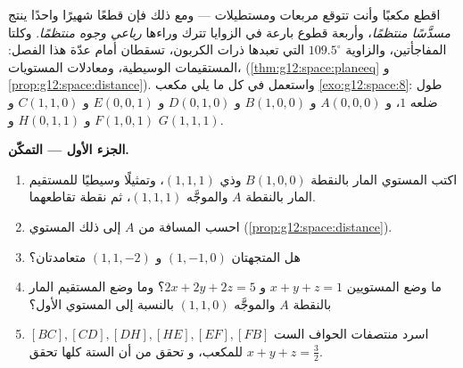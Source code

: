 \begin{problem}
\label{pb:g12:space:1}
اقطع مكعبًا وأنت تتوقع مربعات ومستطيلات --- ومع ذلك فإن قطعًا
شهيرًا واحدًا ينتج \emph{مسدَّسًا منتظمًا}، وأربعة قطوع بارعة
في الزوايا تترك وراءها \emph{رباعي وجوه منتظمًا}. وكلتا
المفاجأتين، والزاوية $109.5^\circ$ التي تعبدها ذرات الكربون،
تسقطان أمام عدّة هذا الفصل: المستقيمات الوسيطية، ومعادلات المستويات،
 (\cref{thm:g12:space:planeeq} و
\cref{prop:g12:space:distance}). واستعمل في كل ما يلي مكعب
\cref{exo:g12:space:8}: طول ضلعه $1$، و $A(0,0,0)$ و $B(1,0,0)$
و $D(0,1,0)$ و $E(0,0,1)$ و $C(1,1,0)$ و $F(1,0,1)$ و $H(0,1,1)$
و $G(1,1,1)$.

\medskip
\noindent\textbf{الجزء الأول --- التمكّن.}
\begin{enumerate}
  \item اكتب  المستوي المار بالنقطة $B(1,0,0)$ وذي
         $(1,1,1)$، وتمثيلًا وسيطيًا
        للمستقيم المار بالنقطة $A$ والموجَّه  $(1,1,1)$، ثم
        نقطة تقاطعهما.
  \item احسب المسافة من $A$ إلى ذلك المستوي
        (\cref{prop:g12:space:distance}).
  \item هل المتجهتان $(1,-1,0)$ و $(1,1,-2)$ متعامدتان؟
  \item ما وضع المستويين $x + y + z = 1$ و
        $2x + 2y + 2z = 5$؟ وما وضع المستقيم المار بالنقطة $A$ والموجَّه 
        $(1,1,0)$ بالنسبة إلى المستوي الأول؟
  \item اسرد منتصفات الحواف الست
        $[BC], [CD], [DH], [HE], [EF], [FB]$ للمكعب، و
        تحقق من أن الستة كلها تحقق 
        $x + y + z = \frac32$.
\end{enumerate}


\end{problem}
